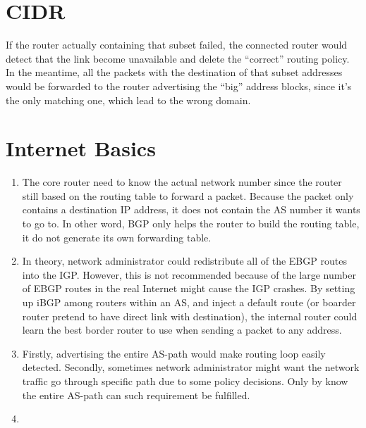 \documentclass[12pt,titlepage,letterpaper]{article}
\begin{document}
\section{CIDR}
If the router actually containing that subset failed, the connected router
would detect that the link become unavailable and delete the ``correct''
routing policy. In the meantime, all the packets with the destination of that
subset addresses would be forwarded to the router advertising the ``big''
address blocks, since it's the only matching one, which lead to the wrong
domain.

\section{Internet Basics}
\begin{enumerate}[label=\bfseries\alph*)]
    \item The core router need to know the actual network number since the
        router still based on the routing table to forward a packet. Because
        the packet only contains a destination IP address, it does not contain
        the AS number it wants to go to. In other word, BGP only helps the
        router to build the routing table, it do not generate its own
        forwarding table.
    \item In theory, network administrator could redistribute all of the EBGP
        routes into the IGP. However, this is not recommended because of the
        large number of EBGP routes in the real Internet might cause the IGP
        crashes. By setting up iBGP among routers within an AS, and inject a
        default route (or boarder router pretend to have direct link with
        destination), the internal router could learn the best border router to
        use when sending a packet to any address.
    \item Firstly, advertising the entire AS-path would make routing loop
        easily detected. Secondly, sometimes network administrator might want
        the network traffic go through specific path due to some policy
        decisions. Only by know the entire AS-path can such requirement be
        fulfilled.
    \item 
\end{enumerate}
\end{document}
